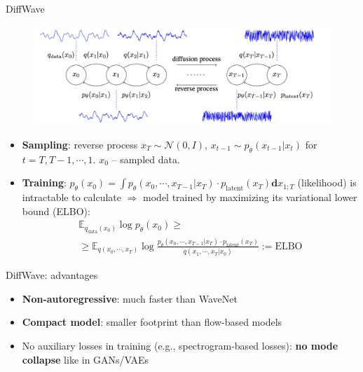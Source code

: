 \begin{frame}{DiffWave}
        \begin{figure}
    	\centering
    	\includegraphics[width=0.8\linewidth]{figs/diffusion_audio.png}
    \end{figure}
    
    \begin{itemize}
        \item \textbf{Sampling}: reverse process $x_{T} \sim \mathcal{N}(0, I)$, $x_{t-1} \sim p_{\theta}(x_{t-1}|x_t)$ for $t = T, T - 1, \cdots , 1$. $x_0$ -- sampled data.
        \item \textbf{Training}: $p_{\theta}(x_{0})=\int p_{\theta}(x_0, \cdots, x_{T-1}|x_{T})\cdot p_{\mathrm{latent}}(x_{T}) \mathbf{d}x_{1;T}$ (likelihood) is intractable to calculate $\Rightarrow$ model trained by maximizing its variational lower bound (ELBO):
        \begin{multline*}
        \mathbb{E}_{q_{\mathrm{data}}(x_{0})}\log p_{\theta}(x_{0}) \geq \\
        \geq \mathbb{E}_{q(x_{0},\cdots,x_T)}\log{\frac{p_{\theta}(x_{0},\cdots,x_{T-1}|x_{T})\cdot p_{\mathrm{latent}}(x_{T})}{q(x_{1},\cdots,x_{T}|x_{0})}}:={\mathrm{ELBO}}
        \end{multline*}
    \end{itemize}
    

\end{frame}
\begin{frame}{DiffWave: advantages}
    \begin{itemize}
        \item \textbf{Non-autoregressive}: much faster than WaveNet
        \item \textbf{Compact model}: smaller footprint than flow-based models
        \item No auxiliary losses in training (e.g., spectrogram-based losses): \textbf{no mode collapse} like in GANs/VAEs
    \end{itemize}

\end{frame}
 
